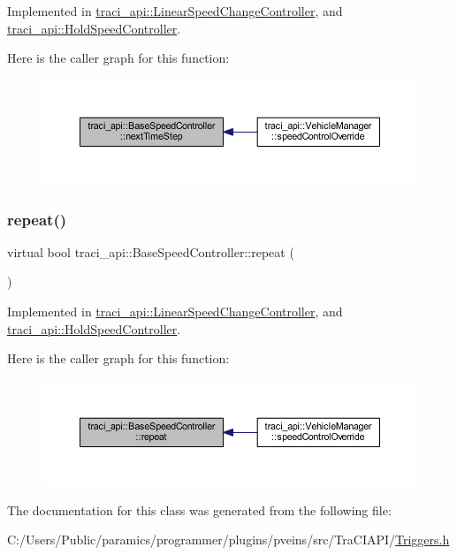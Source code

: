 Implemented in \hyperlink{classtraci__api_1_1_linear_speed_change_controller_a31e52d6f77c96a88dda160226335bacd}{traci\+\_\+api\+::\+Linear\+Speed\+Change\+Controller}, and \hyperlink{classtraci__api_1_1_hold_speed_controller_a61476bf22b8252d2a0badd2214b7357a}{traci\+\_\+api\+::\+Hold\+Speed\+Controller}.

Here is the caller graph for this function\+:\nopagebreak
\begin{figure}[H]
\begin{center}
\leavevmode
\includegraphics[width=350pt]{classtraci__api_1_1_base_speed_controller_ab9658ce36f91de8a34bb710b3241c210_icgraph}
\end{center}
\end{figure}
\mbox{\label{classtraci__api_1_1_base_speed_controller_a2d4b22945d4cb27f5fe24b05700021b6}} 
\subsubsection{\texorpdfstring{repeat()}{repeat()}}
{\footnotesize\ttfamily virtual bool traci\+\_\+api\+::\+Base\+Speed\+Controller\+::repeat (\begin{DoxyParamCaption}{ }\end{DoxyParamCaption})\hspace{0.3cm}{\ttfamily [pure virtual]}}



Implemented in \hyperlink{classtraci__api_1_1_linear_speed_change_controller_aaa5f31ea0c57db838a5786509fc03446}{traci\+\_\+api\+::\+Linear\+Speed\+Change\+Controller}, and \hyperlink{classtraci__api_1_1_hold_speed_controller_acf2f2b8595dd8a135b13be736ee29d63}{traci\+\_\+api\+::\+Hold\+Speed\+Controller}.

Here is the caller graph for this function\+:\nopagebreak
\begin{figure}[H]
\begin{center}
\leavevmode
\includegraphics[width=350pt]{classtraci__api_1_1_base_speed_controller_a2d4b22945d4cb27f5fe24b05700021b6_icgraph}
\end{center}
\end{figure}


The documentation for this class was generated from the following file\+:\begin{DoxyCompactItemize}
\item 
C\+:/\+Users/\+Public/paramics/programmer/plugins/pveins/src/\+Tra\+C\+I\+A\+P\+I/\hyperlink{_triggers_8h}{Triggers.\+h}\end{DoxyCompactItemize}
